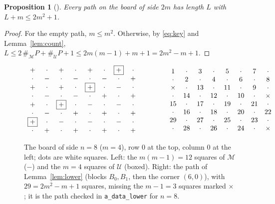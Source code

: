 \documentclass[11pt]{amsart}
\theoremstyle{plain}
\newtheorem{proposition}[theorem]{Proposition}
\theoremstyle{definition}
\newcommand{\cM}{\mathcal{M}}
\newcommand{\cU}{\mathcal{U}}
\begin{document}
\begin{proposition}[]\label{prop:upper}
Every path on the board of side $2m$ has length $L$ with $L+m\le 2m^2+1$.
\end{proposition}

\begin{proof}
For the empty path, $m\le m^2$. Otherwise, by \eqref{eq:key} and Lemma~\ref{lem:count}, $L\le 2\,\#_\cM P+\#_\cU P+1\le 2m(m-1)+m+1=2m^2-m+1$.
\end{proof}

\begin{figure}[t]
\footnotesize\setlength{\arraycolsep}{4pt}\setlength{\fboxsep}{0.5pt}\renewcommand{\arraystretch}{1.05}
\[
\begin{array}{cccccccc}
+ & \cdot & + & \cdot & + & \cdot & \fbox{$+$} & \cdot \\
\cdot & - & \cdot & - & \cdot & - & \cdot & + \\
+ & \cdot & + & \cdot & \fbox{$+$} & \cdot & - & \cdot \\
\cdot & - & \cdot & - & \cdot & + & \cdot & + \\
+ & \cdot & \fbox{$+$} & \cdot & - & \cdot & - & \cdot \\
\cdot & - & \cdot & + & \cdot & + & \cdot & + \\
\fbox{$+$} & \cdot & - & \cdot & - & \cdot & - & \cdot \\
\cdot & + & \cdot & + & \cdot & + & \cdot & +
\end{array}
\qquad\qquad
\begin{array}{cccccccc}
1 & \cdot & 3 & \cdot & 5 & \cdot & 7 & \cdot \\
\cdot & 2 & \cdot & 4 & \cdot & 6 & \cdot & 8 \\
\times & \cdot & 13 & \cdot & 11 & \cdot & 9 & \cdot \\
\cdot & 14 & \cdot & 12 & \cdot & 10 & \cdot & \times \\
15 & \cdot & 17 & \cdot & 19 & \cdot & 21 & \cdot \\
\cdot & 16 & \cdot & 18 & \cdot & 20 & \cdot & 22 \\
29 & \cdot & 27 & \cdot & 25 & \cdot & 23 & \cdot \\
\cdot & 28 & \cdot & 26 & \cdot & 24 & \cdot & \times
\end{array}
\]
\caption{The board of side $n=8$ ($m=4$), row $0$ at the top, column $0$ at the left; dots are white squares. Left: the $m(m-1)=12$ squares of $\cM$ ($-$) and the $m=4$ squares of $\cU$ (boxed). Right: the path of Lemma~\ref{lem:lower} (blocks $B_0,B_1$, then the corner $(6,0)$), with $29=2m^2-m+1$ squares, missing the $m-1=3$ squares marked $\times$; it is the path checked in \texttt{a\_data\_lower} for $n=8$.}\label{fig:eight}
\end{figure}
\end{document}
